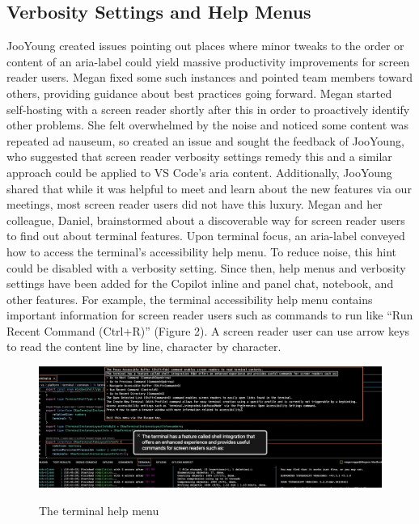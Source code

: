 \documentclass[sigconf]{acmart}
\begin{document}
\hypertarget{verbosity-settings-and-help-menus}{%
\subsection{Verbosity Settings and Help
Menus}\label{verbosity-settings-and-help-menus}}

JooYoung created issues pointing out places where minor tweaks to the
order or content of an aria-label could yield massive productivity
improvements for screen reader users. Megan fixed some such instances
and pointed team members toward others, providing guidance about best
practices going forward. Megan started self-hosting with a screen reader
shortly after this in order to proactively identify other problems. She
felt overwhelmed by the noise and noticed some content was repeated ad
nauseum, so created an issue and sought the feedback of JooYoung, who
suggested that screen reader verbosity settings remedy this and a
similar approach could be applied to VS Code's aria content.
Additionally, JooYoung shared that while it was helpful to meet and
learn about the new features via our meetings, most screen reader users
did not have this luxury. Megan and her colleague, Daniel, brainstormed
about a discoverable way for screen reader users to find out about
terminal features. Upon terminal focus, an aria-label conveyed how to
access the terminal's accessibility help menu. To reduce noise, this
hint could be disabled with a verbosity setting. Since then, help menus
and verbosity settings have been added for the Copilot inline and panel
chat, notebook, and other features. For example, the terminal
accessibility help menu contains important information for screen reader
users such as commands to run like ``Run Recent Command (Ctrl+R)''
(Figure 2). A screen reader user can use arrow keys to read the content
line by line, character by character.

\begin{figure}
{\centering \includegraphics{images/terminal-help-menu.png}}
\caption{The terminal help menu}
\end{figure}
\end{document}
